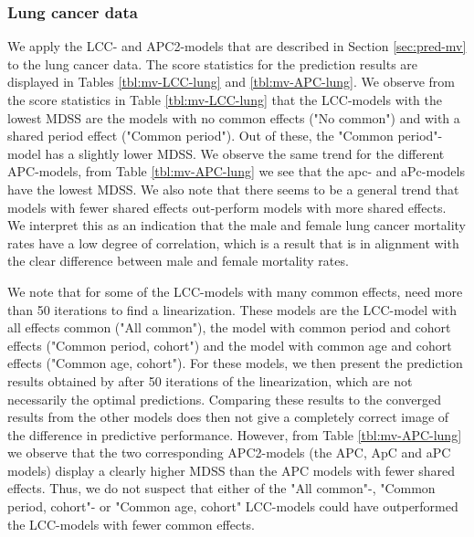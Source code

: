 \subsubsection{Lung cancer data}
\label{sec:mv-lung}
We apply the LCC- and APC2-models that are described in Section \ref{sec:pred-mv} to the lung cancer data. The score statistics for the prediction results are displayed in Tables \ref{tbl:mv-LCC-lung} and \ref{tbl:mv-APC-lung}. We observe from the score statistics in Table \ref{tbl:mv-LCC-lung} that the LCC-models with the lowest MDSS are the models with no common effects ("No common") and with a shared period effect ("Common period"). Out of these, the "Common period"-model has a slightly lower MDSS. We observe the same trend for the different APC-models, from Table \ref{tbl:mv-APC-lung} we see that the apc- and aPc-models have the lowest MDSS. We also note that there seems to be a general trend that models with fewer shared effects out-perform models with more shared effects. We interpret this as an indication that the male and female lung cancer mortality rates have a low degree of correlation, which is a result that is in alignment with the clear difference between male and female mortality rates. 

\newpar We note that for some of the LCC-models with many common effects, \inlabru need more than 50 iterations to find a linearization. These models are the LCC-model with all effects common ("All common"), the model with common period and cohort effects ("Common period, cohort") and the model with common age and cohort effects ("Common age, cohort"). For these models, we then present the prediction results obtained by \inlarbu after 50 iterations of the linearization, which are not necessarily the optimal predictions. Comparing these results to the converged results from the other models does then not give a completely correct image of the difference in predictive performance. However, from Table \ref{tbl:mv-APC-lung} we observe that the two corresponding APC2-models (the APC, ApC and aPC models) display a clearly higher MDSS than the APC models with fewer shared effects. Thus, we do not suspect that either of the "All common"-, "Common period, cohort"- or "Common age, cohort" LCC-models could have outperformed the LCC-models with fewer common effects.

